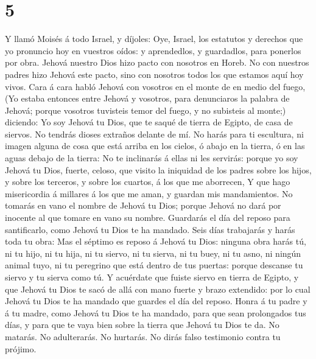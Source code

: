 \hypertarget{section-4}{%
\section{5}\label{section-4}}

 Y llamó Moisés á todo Israel, y díjoles: Oye, Israel, los
estatutos y derechos que yo pronuncio hoy en vuestros oídos: y
aprendedlos, y guardadlos, para ponerlos por obra.  Jehová
nuestro Dios hizo pacto con nosotros en Horeb.  No con
nuestros padres hizo Jehová este pacto, sino con nosotros todos los que
estamos aquí hoy vivos.  Cara á cara habló Jehová con
vosotros en el monte de en medio del fuego,  (Yo estaba
entonces entre Jehová y vosotros, para denunciaros la palabra de Jehová;
porque vosotros tuvisteis temor del fuego, y no subisteis al monte;)
diciendo:  Yo soy Jehová tu Dios, que te saqué de tierra
de Egipto, de casa de siervos.  No tendrás dioses extraños
delante de mí.  No harás para ti escultura, ni imagen
alguna de cosa que está arriba en los cielos, ó abajo en la tierra, ó en
las aguas debajo de la tierra:  No te inclinarás á ellas
ni les servirás: porque yo soy Jehová tu Dios, fuerte, celoso, que
visito la iniquidad de los padres sobre los hijos, y sobre los terceros,
y sobre los cuartos, á los que me aborrecen,  Y que hago
misericordia á millares á los que me aman, y guardan mis mandamientos.
 No tomarás en vano el nombre de Jehová tu Dios; porque
Jehová no dará por inocente al que tomare en vano su nombre.
 Guardarás el día del reposo para santificarlo, como
Jehová tu Dios te ha mandado.  Seis días trabajarás y
harás toda tu obra:  Mas el séptimo es reposo á Jehová tu
Dios: ninguna obra harás tú, ni tu hijo, ni tu hija, ni tu siervo, ni tu
sierva, ni tu buey, ni tu asno, ni ningún animal tuyo, ni tu peregrino
que está dentro de tus puertas: porque descanse tu siervo y tu sierva
como tú.  Y acuérdate que fuiste siervo en tierra de
Egipto, y que Jehová tu Dios te sacó de allá con mano fuerte y brazo
extendido: por lo cual Jehová tu Dios te ha mandado que guardes el día
del reposo.  Honra á tu padre y á tu madre, como Jehová
tu Dios te ha mandado, para que sean prolongados tus días, y para que te
vaya bien sobre la tierra que Jehová tu Dios te da.  No
matarás.  No adulterarás.  No hurtarás.
 No dirás falso testimonio contra tu prójimo.
